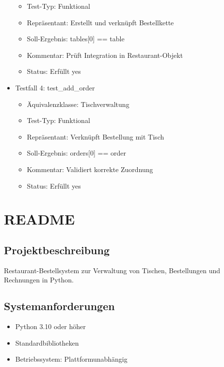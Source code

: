\documentclass[a4paper,11pt]{article}
\begin{document}
\begin{itemize}
\begin{itemize}
        \item Test-Typ: Funktional
        \item Repräsentant: Erstellt und verknüpft Bestellkette
        \item Soll-Ergebnis: tables[0] == table
        \item Kommentar: Prüft Integration in Restaurant-Objekt
        \item Status: Erfüllt yes
    \end{itemize}
  \item Testfall 4: test\_add\_order
    \begin{itemize}
        \item Äquivalenzklasse: Tischverwaltung
        \item Test-Typ: Funktional
        \item Repräsentant: Verknüpft Bestellung mit Tisch
        \item Soll-Ergebnis: orders[0] == order
        \item Kommentar: Validiert korrekte Zuordnung
        \item Status: Erfüllt yes
    \end{itemize}
\end{itemize}




\section{README}
\subsection{Projektbeschreibung}
Restaurant-Bestellsystem zur Verwaltung von Tischen, Bestellungen und Rechnungen in Python.

\subsection{Systemanforderungen}
\begin{itemize}
    \item Python 3.10 oder höher
    \item Standardbibliotheken
    \item Betriebssystem: Plattformunabhängig
\end{itemize}
\end{document}

